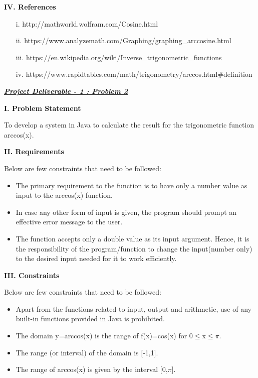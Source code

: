 \documentclass[12pt]{article}
\begin{document}
\begin{flushleft}
	\Large\textbf{IV. References}
\end{flushleft}
		\begin{enumerate}
		\item[i.] http://mathworld.wolfram.com/Cosine.html
		\item[ii.] https://www.analyzemath.com/Graphing/graphing\_arccosine.html
		\item[iii.] https://en.wikipedia.org/wiki/Inverse\_trigonometric\_functions
		\item[iv.] https://www.rapidtables.com/math/trigonometry/arccos.html\#definition
		\end{enumerate}
\pagebreak
	
	\begin{center}
		\Large\textbf\textit\underline{Project Deliverable - 1 : Problem 2} 		
	\end{center}
	\begin{flushleft}
		\Large\textbf{I. Problem Statement}
	\end{flushleft}
		To develop a system in Java to calculate the result for the trigonometric function arccos(x).
		
	\begin{flushleft}
		\Large\textbf{II. Requirements}
	\end{flushleft}
	Below are few constraints that need to be followed:
	\begin{itemize}
		\item The primary requirement to the function is to have only a number value as input to the arccos(x) function. 
		\item In case any other form of input is given, the program should prompt an effective error message to the user.
		\item The function accepts only a double value as its input argument. Hence, it is the responsibility of the program/function to change the input(number only) to the desired input needed for it to work efficiently.
	\end{itemize}
		
	\begin{flushleft}
		\Large\textbf{III. Constraints}
	\end{flushleft}
		Below are few constraints that need to be followed:
		\begin{itemize}
			\item Apart from the functions related to input, output and arithmetic, use of any built-in functions provided in Java is prohibited. 
			\item The domain y=arccos(x) is the range of f(x)=cos(x) for 0$\leq$x$\leq$$\pi$.
			\item The range (or interval) of the domain is [-1,1].
			\item The range of arccos(x) is given by the interval [0,$\pi$].
		\end{itemize}
	
\end{document}
